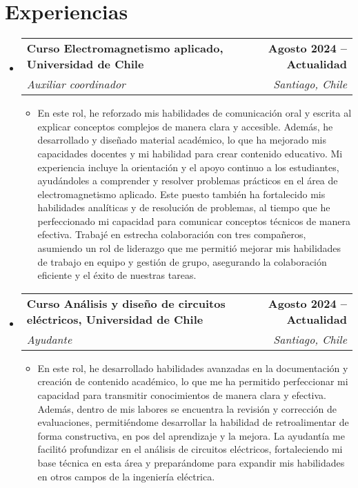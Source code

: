 \documentclass[letterpaper,11pt]{article}
\makeatletter
\newcommand{\resumeItem}[1]{
  \item\small{
    {#1 \vspace{-2pt}}
  }
}
\newcommand{\resumeSubheading}[4]{
  \vspace{-2pt}\item
    \begin{tabular*}{1.0\textwidth}[t]{l@{\extracolsep{\fill}}r}
      \textbf{#1} & \textbf{\small #2} \\
      \textit{\small#3} & \textit{\small #4} \\
    \end{tabular*}\vspace{-7pt}
}
\newcommand{\resumeSubHeadingListStart}{\begin{itemize}[leftmargin=0.0in, label={}]}
\newcommand{\resumeSubHeadingListEnd}{\end{itemize}}
\newcommand{\resumeItemListStart}{\begin{itemize}}
\newcommand{\resumeItemListEnd}{\end{itemize}\vspace{-5pt}}
\makeatother
\begin{document}
\section{Experiencias}
  \resumeSubHeadingListStart

  \resumeSubheading
    {Curso Electromagnetismo aplicado, Universidad de Chile}{Agosto 2024 -- Actualidad}
    {Auxiliar coordinador}{Santiago, Chile}
    \resumeItemListStart

      \resumeItem{En este rol, he reforzado mis habilidades de comunicación oral y escrita al explicar conceptos complejos de manera clara y accesible. Además, he desarrollado y diseñado material académico, lo que ha mejorado mis capacidades docentes y mi habilidad para crear contenido educativo. Mi experiencia incluye la orientación y el apoyo continuo a los estudiantes, ayudándoles a comprender y resolver problemas prácticos en el área de electromagnetismo aplicado. Este puesto también ha fortalecido mis habilidades analíticas y de resolución de problemas, al tiempo que he perfeccionado mi capacidad para comunicar conceptos técnicos de manera efectiva. Trabajé en estrecha colaboración con tres compañeros, asumiendo un rol de liderazgo que me permitió mejorar mis habilidades de trabajo en equipo y gestión de grupo, asegurando la colaboración eficiente y el éxito de nuestras tareas.}

    \resumeItemListEnd
    \vspace{16pt}

    \resumeSubheading
      {Curso Análisis y diseño de circuitos eléctricos, Universidad de Chile}{Agosto 2024 -- Actualidad}
      {Ayudante}{Santiago, Chile}
    \resumeItemListStart

      \resumeItem{En este rol, he desarrollado habilidades avanzadas en la documentación y creación de contenido académico, lo que me ha permitido perfeccionar mi capacidad para transmitir conocimientos de manera clara y efectiva. Además, dentro de mis labores se encuentra la revisión y corrección de evaluaciones, permitiéndome desarrollar la habilidad de retroalimentar de forma constructiva, en pos del aprendizaje y la mejora. La ayudantía me facilitó profundizar en el análisis de circuitos eléctricos, fortaleciendo mi base técnica en esta área y preparándome para expandir mis habilidades en otros campos de la ingeniería eléctrica.}

    \resumeItemListEnd
    
  \resumeSubHeadingListEnd
\end{document}

